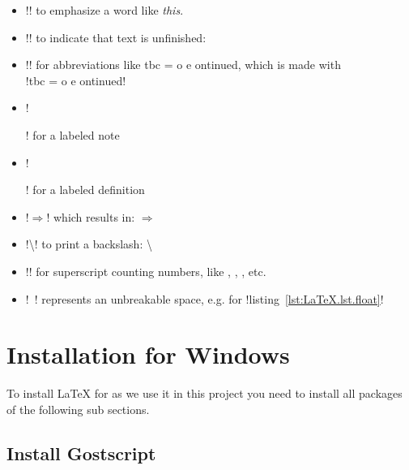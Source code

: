 \begin{itemize}
\item !\emph{}! to emphasize a word like \emph{this}.
\item !\tbc! to indicate that text is unfinished: \tbc
{}
\item !\abbr{}! for abbreviations like tbc = o
      e ontinued, which is made with \\
      !tbc = o e ontinued!
\item !\begin{Note} \end{Note}! for a labeled note
\item !\begin{Definition} \end{Definition}! for a labeled definition
\item !$\Rightarrow$! which results in: $\Rightarrow$
\item !\textbackslash! to print a backslash: \textbackslash
{}
\item !\nth{}! for superscript counting numbers,
      like , , , etc.
\item !~! represents an unbreakable space, e.g. for
      !listing~\ref{lst:LaTeX.lst.float}!
\end{itemize}

\section{Installation for Windows}

To install LaTeX for as we use it in this project you need to install all
packages of the following sub sections.

\subsection{Install Gostscript}

